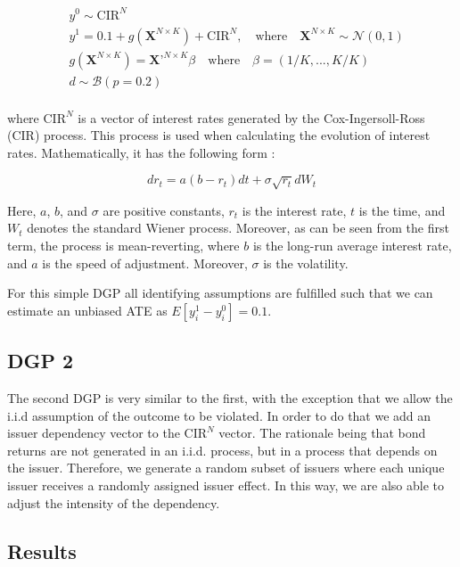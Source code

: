     \begin{align*}
        &y^0 \sim \text{CIR}^N \\
        &y^1 = 0.1 + g(\textbf{X}^{N\times K}) + \text{CIR}^N, \quad \text{where} \quad \textbf{X}^{N\times K} \sim \mathcal{N}(0,1) \\
        &g(\textbf{X}^{N\times K}) = \textbf{X'}^{N\times K} \beta \quad \text{where} \quad \beta = (1/K,...,K/K) \\
        &d \sim \mathcal{B}(p=0.2) \\
    \end{align*}

where $\text{CIR}^N$ is a vector of interest rates generated by the Cox-Ingersoll-Ross (CIR) process. This process is used when calculating the evolution of interest rates. Mathematically, it has the following form \citep[p. 391]{cox2005theory}:

\begin{equation}
d r_t=a\left(b-r_t\right) d t+\sigma \sqrt{r_t} d W_t
\end{equation}

Here, $a$, $b$, and $\sigma$ are positive constants, $r_t$ is the interest rate, $t$ is the time, and $W_t$ denotes the standard Wiener process. Moreover, as can be seen from the first term, the process is mean-reverting, where $b$ is the long-run average interest rate, and $a$ is the speed of adjustment. Moreover, $\sigma$ is the volatility.

For this simple DGP all identifying assumptions are fulfilled such that we can estimate an unbiased ATE as $E[y_i^{1}-y_i^{0}]=0.1$.

\subsection*{DGP 2}

The second DGP is very similar to the first, with the exception that we allow the i.i.d assumption of the outcome to be violated. In order to do that we add an issuer dependency vector to the $\text{CIR}^N$ vector. The rationale being that bond returns are not generated in an i.i.d. process, but in a process that depends on the issuer. Therefore, we generate a random subset of issuers where each unique issuer receives a randomly assigned issuer effect. In this way, we are also able to adjust the intensity of the dependency.

\subsection*{Results}

